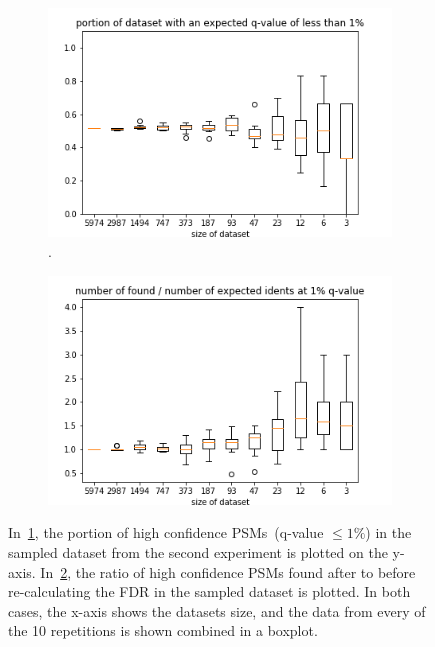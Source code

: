 \begin{figure}
	\normalsize
	\centering
	
\end{figure}
\begin{figure}
	\normalsize
	\centering	
	\begin{subfigure}{0.49 \textwidth}
		\includegraphics[width = \textwidth]{figures/expected.png}
		\caption[Portion of the dataset with high-confidence PSMs]{.}
		\label{fig:results:small_dataset_snd_expected}
	\end{subfigure}
	\hfill
	\begin{subfigure}{0.49 \textwidth}
		\includegraphics[width = \textwidth]{figures/found_vs_expected_dxl.png}
		\caption{}
		\label{fig:results:small_dataset_snd_found_dxl}
	\end{subfigure}
	\caption[Effect of splitting on dataset and FDR estimation]{ In~\ref{fig:results:small_dataset_snd_expected}, the portion of high confidence PSMs~(q-value $\leq1\%$) in the sampled dataset from the second experiment is plotted on the y-axis. In~\ref{fig:results:small_dataset_snd_found_dxl}, the ratio of high confidence PSMs found after to before re-calculating the FDR in the sampled dataset is plotted. In both cases, the x-axis shows the datasets size, and the data from every of the 10 repetitions is shown combined in a boxplot.}
	\label{fig:results:small_dataset_snd_found}
\end{figure}

